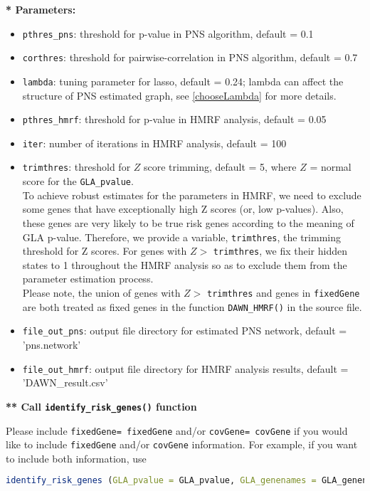 \documentclass{article}
\begin{document}
	\textbf{* Parameters:}
	\begin{itemize}
		\item \texttt{pthres\_pns}: threshold for p-value in PNS algorithm, default = 0.1
		\item \texttt{corthres}: threshold for pairwise-correlation in PNS algorithm, default = 0.7
		\item \texttt{lambda}: tuning parameter for lasso, default = 0.24; lambda can affect the structure of PNS estimated graph, see \ref{chooseLambda} for more details.
		\item \texttt{pthres\_hmrf}: threshold for p-value in HMRF analysis, default = 0.05
		\item \texttt{iter}: number of iterations in HMRF analysis, default = 100
		\label{trimthres}
		\item \texttt{trimthres}: threshold for $Z$ score trimming, default = 5, where $Z$ = normal score for the \texttt{GLA\_pvalue}.\\
		To achieve robust estimates for the parameters in HMRF, we need to exclude some genes that have exceptionally high Z scores (or, low p-values). Also, these genes are very likely to be true risk genes according to the meaning of GLA p-value. Therefore, we provide a variable, \texttt{trimthres}, the trimming threshold for Z scores. For genes with $Z>$ \texttt{trimthres}, we fix their hidden states to 1 throughout the HMRF analysis so as to exclude them from the parameter estimation process.\\
		Please note, the union of genes with $Z>$ \texttt{trimthres} and genes in \texttt{fixedGene} are both treated as fixed genes in the function \texttt{DAWN\_HMRF()} in the source file.
		\item \texttt{file\_out\_pns}: output file directory for estimated PNS network, default = 'pns.network'
		\item \texttt{file\_out\_hmrf}: output file directory for HMRF analysis results, default = 'DAWN\_result.csv'
	\end{itemize}

	\textbf{** Call \texttt{identify\_risk\_genes()} function}
	
	Please include \texttt{fixedGene= fixedGene} and/or \texttt{covGene= covGene} if you would like to include \texttt{fixedGene} and/or \texttt{covGene} information. For example, if you want to include both information, use
	\begin{lstlisting}[language=R]
	identify_risk_genes (GLA_pvalue = GLA_pvalue, GLA_genenames = GLA_genenames, expdata = expdata, covGene= covGene)
	\end{lstlisting}
\end{document}
